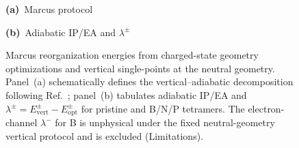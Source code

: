 \begin{figure}[t]
\centering
\begin{minipage}[c]{0.47\textwidth}
\centering
\textbf{(a)}~Marcus protocol\par\vspace{0.6em}
%
\end{minipage}\hfill
\begin{minipage}[c]{0.49\textwidth}
\centering
\textbf{(b)}~Adiabatic IP/EA and $\lambda^{\pm}$\par\vspace{0.8em}
%
\end{minipage}
\caption{\label{fig:marcus}Marcus reorganization energies from charged-state geometry optimizations and vertical single-points at the neutral geometry.
Panel~(a) schematically defines the vertical--adiabatic decomposition following Ref.~; panel~(b) tabulates adiabatic IP/EA and $\lambda^{\pm}=E_{\mathrm{vert}}^{\pm}-E_{\mathrm{opt}}^{\pm}$ for pristine and B/N/P tetramers.
The electron-channel $\lambda^{-}$ for B is unphysical under the fixed neutral-geometry vertical protocol and is excluded (Limitations).}
\end{figure}
